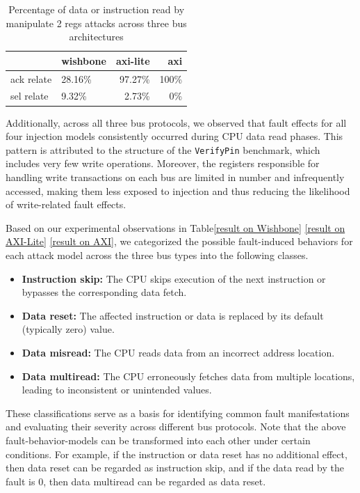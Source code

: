 \begin{table}
\caption{Percentage of data or instruction read by manipulate 2 regs attacks across three bus architectures}
\label{Percentage data}
\begin{tabular}{llrr}
\toprule
& wishbone & axi-lite & axi \\
\midrule
ack relate & 28.16\% & 97.27\% & 100\% \\
sel relate & 9.32\% & 2.73\% & 0\% \\
\bottomrule
\end{tabular}
\end{table}


Additionally, across all three bus protocols, we observed that fault effects for all four injection models consistently occurred during CPU data read phases. This pattern is attributed to the structure of the \texttt{VerifyPin} benchmark, which includes very few write operations. Moreover, the registers responsible for handling write transactions on each bus are limited in number and infrequently accessed, making them less exposed to injection and thus reducing the likelihood of write-related fault effects.

Based on our experimental observations in Table\ref{result on Wishbone} \ref{result on AXI-Lite} \ref{result on AXI}, we categorized the possible fault-induced behaviors for each attack model across the three bus types into the following classes. 

\begin{itemize}
\item \textbf{Instruction skip:} The CPU skips execution of the next instruction or bypasses the corresponding data fetch.
\item \textbf{Data reset:} The affected instruction or data is replaced by its default (typically zero) value.
\item \textbf{Data misread:} The CPU reads data from an incorrect address location.
\item \textbf{Data multiread:} The CPU erroneously fetches data from multiple locations, leading to inconsistent or unintended values.
\end{itemize}

These classifications serve as a basis for identifying common fault manifestations and evaluating their severity across different bus protocols. Note that the above fault-behavior-models can be transformed into each other under certain conditions. For example, if the instruction or data reset has no additional effect, then data reset can be regarded as instruction skip, and if the data read by the fault is 0, then data multiread can be regarded as data reset.

